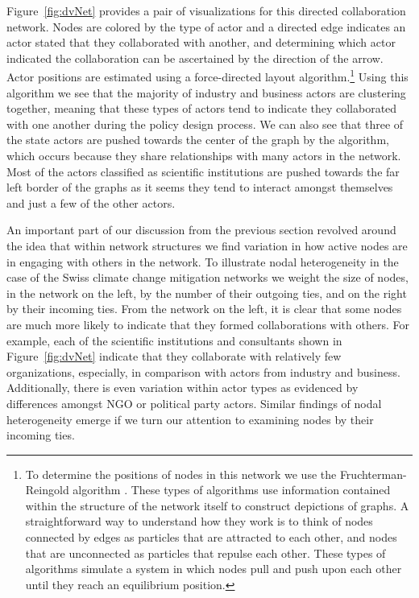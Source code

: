 \documentclass[12pt,pdflatex]{elsarticle}
\begin{document}
Figure~\ref{fig:dvNet} provides a pair of visualizations for this directed collaboration network. Nodes are colored by the type of actor and a directed edge indicates an actor stated that they collaborated with another, and determining which actor indicated the collaboration can be ascertained by the direction of the arrow. Actor positions are estimated using a force-directed layout algorithm.\footnote{To determine the positions of nodes in this network we use the Fruchterman-Reingold algorithm \citep{fruchterman:reingold:1991}. These types of algorithms use information contained within the structure of the network itself to construct depictions of graphs. A straightforward way to understand how they work is to think of nodes connected by edges as particles that are attracted to each other, and nodes that are unconnected as particles that repulse each other. These types of algorithms simulate a system in which nodes pull and push upon each other until they reach an equilibrium position.} Using this algorithm we see that the majority of industry and business actors are clustering together, meaning that these types of actors tend to indicate they collaborated with one another during the policy design process. We can also see that three of the state actors are pushed towards the center of the graph by the algorithm, which occurs because they share relationships with many actors in the network. Most of the actors classified as scientific institutions are pushed towards the far left border of the graphs as it seems they tend to interact amongst themselves and just a few of the other actors. 

An important part of our discussion from the previous section revolved around the idea that within network structures we find variation in how active nodes are in engaging with others in the network. To illustrate nodal heterogeneity in the case of the Swiss climate change mitigation networks we weight the size of nodes, in the network on the left, by the number of their outgoing ties, and on the right by their incoming ties. From the network on the left, it is clear that some nodes are much more likely to indicate that they formed collaborations with others. For example, each of the scientific institutions and consultants shown in Figure~\ref{fig:dvNet} indicate that they collaborate with relatively few organizations, especially, in comparison with actors from industry and business. Additionally, there is even variation within actor types as evidenced by differences amongst NGO or political party actors. Similar findings of nodal heterogeneity emerge if we turn our attention to examining nodes by their incoming ties. 
\end{document}
